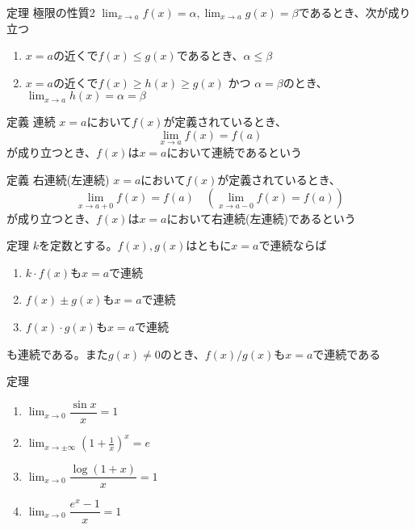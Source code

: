 \documentclass[a4paper]{jarticle}
\begin{document}
    \begin{itembox}[l]{定理 極限の性質2}
        $\lim_{x \to a} f(x) = \alpha, \lim_{x \to a} g(x) = \beta$であるとき、次が成り立つ
        \begin{enumerate}
            \item $x=a$の近くで$f(x) \leq g(x)$であるとき、$\alpha \leq \beta$
            \item $x=a$の近くで$f(x) \geq h(x) \geq g(x)$ かつ $\alpha = \beta$のとき、$\lim_{x \to a} h(x) = \alpha = \beta$
        \end{enumerate}
    \end{itembox}



    \begin{itembox}[l]{定義 連続}
        $x=a$において$f(x)$が定義されているとき、
        \begin{equation}
            \lim_{x \to a} f(x) = f(a)
        \end{equation}
        が成り立つとき、$f(x)$は$x=a$において連続であるという
    \end{itembox}

    \begin{itembox}[l]{定義 右連続(左連続)}
        $x=a$において$f(x)$が定義されているとき、
        \begin{equation}
            \lim_{x \to a+0} f(x) = f(a) \quad (\lim_{x \to a-0} f(x) = f(a))
        \end{equation}
        が成り立つとき、$f(x)$は$x=a$において右連続(左連続)であるという

    \end{itembox}

    \begin{itembox}[l]{定理}
        $k$を定数とする。$f(x), g(x)$はともに$x=a$で連続ならば
        \begin{enumerate}
            \item $k \cdot f(x)$も$x=a$で連続
            \item $f(x) \pm g(x)$も$x=a$で連続
            \item $f(x) \cdot g(x)$も$x=a$で連続
        \end{enumerate}
        も連続である。また$g(x) \neq 0$のとき、$f(x) / g(x)$も$x=a$で連続である
    \end{itembox}

    \begin{itembox}[l]{定理}
        \begin{enumerate}
            \item $\lim_{x \to 0} \dfrac{\sin x}{x} = 1$
            \item $\lim_{x \to \pm \infty} (1 + \frac{1}{x})^x = e$
            \item $\lim_{x \to 0} \dfrac{\log (1 + x)}{x} = 1$
            \item $\lim_{x \to 0} \dfrac{e^x - 1}{x} = 1$
        \end{enumerate}
    \end{itembox}
\end{document}
